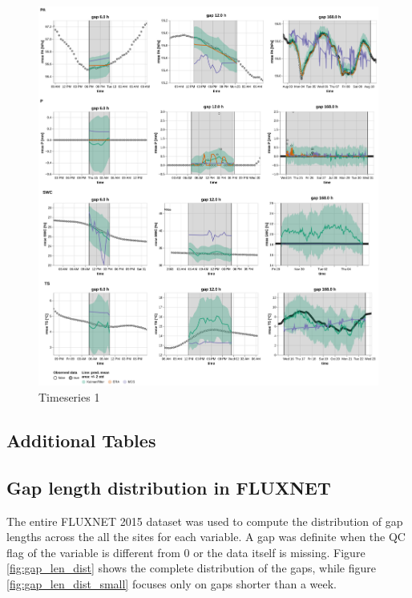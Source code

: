 \documentclass{article}
\newcommand{\imgwidth}{6in}
\let\Oldsubsection\subsection
\renewcommand{\subsection}{\FloatBarrier\Oldsubsection}
\begin{document}
\begin{figure}
\centerline{\includegraphics[width=\imgwidth]{timeseries_2_2}}
\caption{Timeseries 1}
\label{fig:ts_2_2}
\end{figure}
\subsection{Additional Tables}









\subsection{Gap length distribution in FLUXNET}



The entire FLUXNET 2015 dataset was used to compute the distribution of gap lengths across the all the sites for each variable. A gap was definite when the QC flag of the variable is different from 0 or the data itself is missing. Figure \ref{fig:gap_len_dist} shows the complete distribution of the gaps, while figure \ref{fig:gap_len_dist_small} focuses only on gaps shorter than a week.
\end{document}
